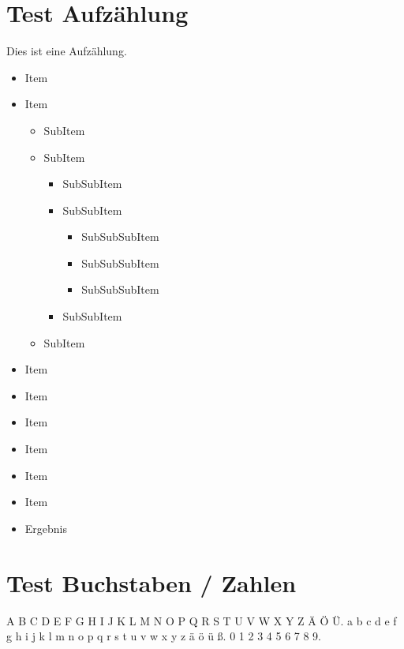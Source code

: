 \documentclass[serifmath,a0paper,noDIN,MathematikA0]{tudmathposter}
\begin{document}
\section*{Test Aufzählung}
\begin{multicols}{2}
Dies ist eine Aufzählung.

\begin{itemize}
\item Item
\item Item
  \begin{itemize}
  \item SubItem
  \item SubItem
    \begin{itemize}
    \item SubSubItem
    \item SubSubItem
      \begin{itemize}
      \item SubSubSubItem
      \item SubSubSubItem
      \item SubSubSubItem
      \end{itemize}
    \item SubSubItem
    \end{itemize}
  \item SubItem
  \end{itemize}
\renewcommand*\labelitemi{\textbullet}
\item Item \vrule\kern1cm\vrule
\renewcommand*\labelitemi{\textbullet\,}
\item Item \vrule\kern1cm\vrule
\renewcommand*\labelitemi{\textbullet\kern 0.25em}
\item Item \vrule\kern1cm\vrule
\renewcommand*\labelitemi{\textbullet\,\,}
\item Item \vrule\kern1cm\vrule
\renewcommand*\labelitemi{\textbullet\enspace}
\item Item \vrule\kern1cm\vrule
\renewcommand*\labelitemi{\textbullet\kern 1em}
\item Item \vrule\kern1cm\vrule
\item[\raisebox{.2ex}{$\Rightarrow$}] Ergebnis
\end{itemize}

\section*{Test Buchstaben / Zahlen}
A B C D E F G H I J K L M N O P Q R S T U V W X Y Z Ä Ö Ü.
a b c d e f g h i j k l m n o p q r s t u v w x y z ä ö ü ß.
0 1 2 3 4 5 6 7 8 9.


\end{multicols}
\end{document}
